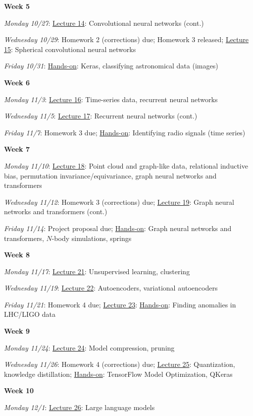 \documentclass[12pt]{article}
\begin{document}
\noindent\textbf{Week 5}

\emph{Monday 10/27}: \underline{Lecture 14}: Convolutional neural networks (cont.)

\emph{Wednesday 10/29}: Homework 2 (corrections) due; Homework 3 released; \underline{Lecture 15}: Spherical convolutional neural networks

\emph{Friday 10/31}: \underline{Hands-on}: Keras, classifying astronomical data (images)

\noindent\textbf{Week 6}

\emph{Monday 11/3}: \underline{Lecture 16}: Time-series data, recurrent neural networks

\emph{Wednesday 11/5}: \underline{Lecture 17}: Recurrent neural networks (cont.)

\emph{Friday 11/7}: Homework 3 due; \underline{Hands-on}: Identifying radio signals (time series)

\noindent\textbf{Week 7}

\emph{Monday 11/10}: \underline{Lecture 18}: Point cloud and graph-like data, relational inductive bias, permutation invariance/equivariance, graph neural networks and transformers

\emph{Wednesday 11/12}: Homework 3 (corrections) due; \underline{Lecture 19}: Graph neural networks and transformers (cont.)

\emph{Friday 11/14}: Project proposal due; \underline{Hands-on}: Graph neural networks and transformers, $N$-body simulations, springs

\noindent\textbf{Week 8}

\emph{Monday 11/17}: \underline{Lecture 21}: Unsupervised learning, clustering

\emph{Wednesday 11/19}: \underline{Lecture 22}: Autoencoders, variational autoencoders

\emph{Friday 11/21}: Homework 4 due; \underline{Lecture 23}: \underline{Hands-on}: Finding anomalies in LHC/LIGO data

\noindent\textbf{Week 9}

\emph{Monday 11/24}: \underline{Lecture 24}: Model compression, pruning

\emph{Wednesday 11/26}: Homework 4 (corrections) due; \underline{Lecture 25}: Quantization, knowledge distillation; \underline{Hands-on}: TensorFlow Model Optimization, QKeras


\noindent\textbf{Week 10}

\emph{Monday 12/1}: \underline{Lecture 26}: Large language models
\end{document}
